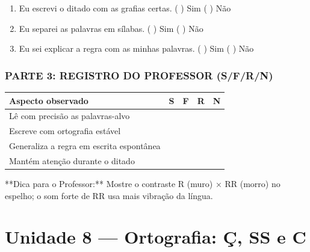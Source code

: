 \begin{exercicio}
\begin{enumerate}[label=\alph*)]
  \item Eu escrevi o ditado com as grafias certas.  \quad ( ) Sim   ( ) Não

  \item Eu separei as palavras em sílabas.  \quad ( ) Sim   ( ) Não

  \item Eu sei explicar a regra com as minhas palavras.  \quad ( ) Sim   ( ) Não

\end{enumerate}

\subsection*{PARTE 3: REGISTRO DO PROFESSOR (S/F/R/N)}

\begin{center}
\renewcommand{\arraystretch}{1.4}
\begin{tabular}{@{}p{9cm}cccc@{}}
\toprule
Aspecto observado & S & F & R & N \\
\midrule
Lê com precisão as palavras-alvo & & & & \\
Escreve com ortografia estável & & & & \\
Generaliza a regra em escrita espontânea & & & & \\
Mantém atenção durante o ditado & & & & \\
\bottomrule\end{tabular}\end{center}

\end{exercicio}

\begin{dica}
**Dica para o Professor:** Mostre o contraste R (muro) × RR (morro) no espelho; o som forte de RR usa mais vibração da língua.
\end{dica}



\chapter{Unidade 8 --- Ortografia: Ç, SS e C}


